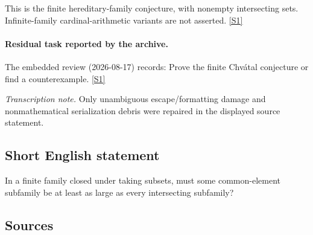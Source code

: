 \documentclass[11pt,a4paper]{article}
\newcommand{\sref}[2]{\hyperlink{source:#1:#2}{[S#2]}}
\begin{document}
This is the finite hereditary-family conjecture, with nonempty intersecting sets. Infinite-family cardinal-arithmetic variants are not asserted. \sref{statement}{1}

\paragraph{Residual task reported by the archive.}

The embedded review (2026-08-17) records: Prove the finite Chvátal conjecture or find a counterexample. \sref{statement}{1}

{\small\emph{Transcription note.} Only unambiguous escape/formatting damage and nonmathematical serialization debris were repaired in the displayed source statement.}

\subsection{Short English statement}

In a finite family closed under taking subsets, must some common-element subfamily be at least as large as every intersecting subfamily?

\subsection{Sources}
\end{document}
